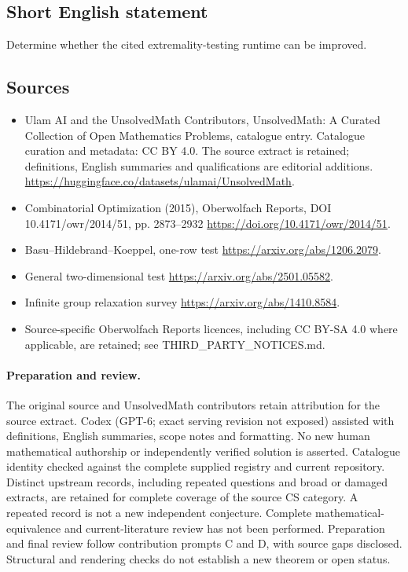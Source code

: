 \documentclass[11pt]{article}
\begin{document}
\subsection{Short English statement}
Determine whether the cited extremality-testing runtime can be improved.
\subsection{Sources}
\begin{itemize}
\item[\hypertarget{source:statement:1}{S1}] Ulam AI and the UnsolvedMath Contributors, UnsolvedMath: A Curated Collection of Open Mathematics Problems, catalogue entry. Catalogue curation and metadata: CC BY 4.0. The source extract is retained; definitions, English summaries and qualifications are editorial additions.
\url{https://huggingface.co/datasets/ulamai/UnsolvedMath}.
\item[\hypertarget{source:statement:2}{S2}] Combinatorial Optimization (2015), Oberwolfach Reports, DOI 10.4171/owr/2014/51, pp. 2873--2932
\url{https://doi.org/10.4171/owr/2014/51}.
\item[\hypertarget{source:statement:3}{S3}] Basu--Hildebrand--Koeppel, one-row test
\url{https://arxiv.org/abs/1206.2079}.
\item[\hypertarget{source:statement:4}{S4}] General two-dimensional test
\url{https://arxiv.org/abs/2501.05582}.
\item[\hypertarget{source:statement:5}{S5}] Infinite group relaxation survey
\url{https://arxiv.org/abs/1410.8584}.
\item Source-specific Oberwolfach Reports licences, including CC BY-SA 4.0 where applicable, are retained; see THIRD\_PARTY\_NOTICES.md.
\end{itemize}
\paragraph{Preparation and review.}
The original source and UnsolvedMath contributors retain attribution for the source extract. Codex (GPT-6; exact serving revision not exposed) assisted with definitions, English summaries, scope notes and formatting. No new human mathematical authorship or independently verified solution is asserted. Catalogue identity checked against the complete supplied registry and current repository. Distinct upstream records, including repeated questions and broad or damaged extracts, are retained for complete coverage of the source CS category. A repeated record is not a new independent conjecture. Complete mathematical-equivalence and current-literature review has not been performed. Preparation and final review follow contribution prompts C and D, with source gaps disclosed. Structural and rendering checks do not establish a new theorem or open status.
\label{end:statement}
\end{document}
